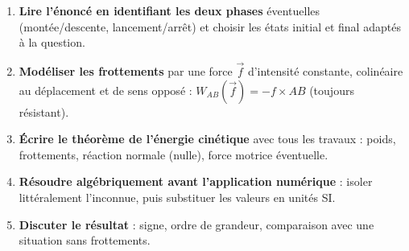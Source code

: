 \documentclass[11pt]{article}
\begin{document}
\begin{methode}
\begin{enumerate}
\item \textbf{Lire l'énoncé en identifiant les deux phases} éventuelles (montée/descente, lancement/arrêt) et choisir les états initial et final adaptés à la question.
\item \textbf{Modéliser les frottements} par une force $\vec{f}$ d'intensité constante, colinéaire au déplacement et de sens opposé : $W_{AB}(\vec{f}) = -f\times AB$ (toujours résistant).
\item \textbf{Écrire le théorème de l'énergie cinétique} avec tous les travaux : poids, frottements, réaction normale (nulle), force motrice éventuelle.
\item \textbf{Résoudre algébriquement avant l'application numérique} : isoler littéralement l'inconnue, puis substituer les valeurs en unités SI.
\item \textbf{Discuter le résultat} : signe, ordre de grandeur, comparaison avec une situation sans frottements.
\end{enumerate}
\end{methode}
\end{document}
